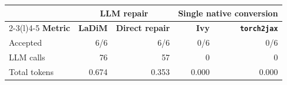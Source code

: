 \begin{tabular*}{\linewidth}{@{\extracolsep{\fill}}lrrrr@{}}
\toprule
& \multicolumn{2}{c}{\textbf{LLM repair}} & \multicolumn{2}{c}{\textbf{Single native conversion}} \\
\cmidrule(lr){2-3}\cmidrule(l){4-5}
\textbf{Metric} & \textbf{LaDiM} & \textbf{Direct repair} & \textbf{Ivy} & \textbf{\texttt{torch2jax}} \\
\midrule
Accepted & 6/6 & 6/6 & 0/6 & 0/6 \\
LLM calls & 76 & 57 & 0 & 0 \\
Total tokens & 0.674 & 0.353 & 0.000 & 0.000 \\
\bottomrule
\end{tabular*}
